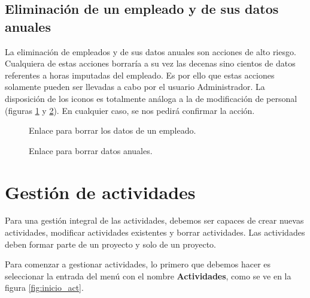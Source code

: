 \subsection{Eliminación de un empleado y de sus datos anuales}

La eliminación de empleados y de sus datos anuales son acciones de alto riesgo.
Cualquiera de estas acciones borraría a su vez las decenas sino cientos de
datos referentes a horas imputadas del empleado. Es por ello que estas acciones
solamente pueden ser llevadas a cabo por el usuario Administrador. La
disposición de los iconos es totalmente análoga a la de modificación de
personal (figuras \ref{fig:bor_persona} y \ref{fig:bor_anuales}). En cualquier
caso, se nos pedirá confirmar la acción.

\begin{figure}
\centering
{}
\caption{Enlace para borrar los datos de un empleado.}
\label{fig:bor_persona}
\end{figure}

\begin{figure}
\centering
{}
\caption{Enlace para borrar datos anuales.}
\label{fig:bor_anuales}
\end{figure}






\section{Gestión de actividades}
\label{sec:manual_actividades}

Para una gestión integral de las actividades, debemos ser capaces de crear
nuevas actividades, modificar actividades existentes y borrar actividades. Las
actividades deben formar parte de un proyecto y solo de un proyecto.

Para comenzar a gestionar actividades, lo primero que debemos hacer es
seleccionar la entrada del menú con el nombre \textbf{Actividades}, como se ve
en la figura \ref{fig:inicio_act}.

